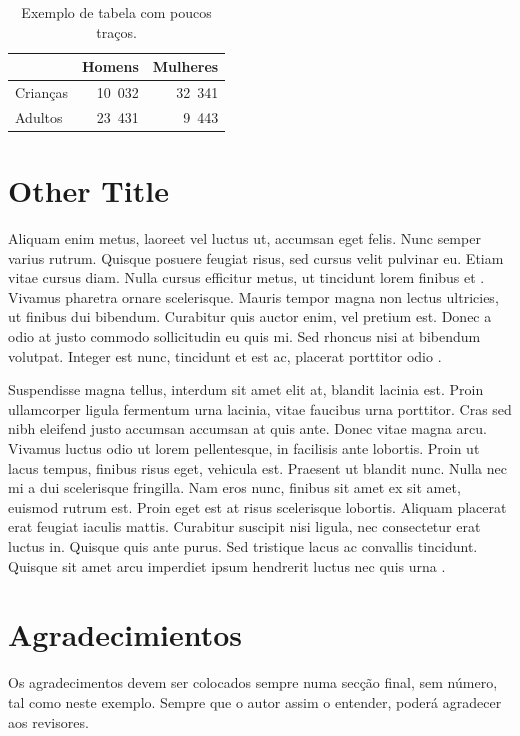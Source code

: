 \documentclass[a4paper, twocolumn, 11pt, twoside]{article}
\begin{document}
\begin{table}[htb]
  \centering
  \begin{tabular}{lrr}
    \toprule
    & \textbf{Homens} & \textbf{Mulheres} \\
    \midrule
    Crianças & 10~032 & 32~341 \\
    Adultos & 23~431 & 9~443 \\
    \bottomrule
  \end{tabular}
  \caption{Exemplo de tabela com poucos traços.}
  \label{tab:1}
\end{table}

\section{Other Title}

 Aliquam enim metus, laoreet vel luctus ut, accumsan eget felis. Nunc semper varius rutrum. Quisque posuere feugiat risus, sed cursus velit pulvinar eu. Etiam vitae cursus diam. Nulla cursus efficitur metus, ut tincidunt lorem finibus et \cite{Simoes-Guinovart-2019}. Vivamus pharetra ornare scelerisque. Mauris tempor magna non lectus ultricies, ut finibus dui bibendum. Curabitur quis auctor enim, vel pretium est. Donec a odio at justo commodo sollicitudin eu quis mi. Sed rhoncus nisi at bibendum volutpat. Integer est nunc, tincidunt et est ac, placerat porttitor odio \citep{Zhou-et-al-2024}. 

  Suspendisse magna tellus, interdum sit amet elit at, blandit lacinia est. Proin ullamcorper ligula fermentum urna lacinia, vitae faucibus urna porttitor. Cras sed nibh eleifend justo accumsan accumsan at quis ante. Donec vitae magna arcu. Vivamus luctus odio ut lorem pellentesque, in facilisis ante lobortis. Proin ut lacus tempus, finibus risus eget, vehicula est. Praesent ut blandit nunc. Nulla nec mi a dui scelerisque fringilla. Nam eros nunc, \cite{Almeida-2003} finibus sit amet ex sit amet, euismod rutrum est. Proin eget est at risus scelerisque lobortis. Aliquam placerat erat feugiat iaculis mattis. Curabitur suscipit nisi ligula, nec consectetur erat luctus in. Quisque quis ante purus. Sed tristique lacus ac convallis tincidunt. Quisque sit amet arcu imperdiet ipsum hendrerit luctus nec quis urna \citep{Simoes-2004}. 



\section*{Agradecimientos}

Os agradecimentos devem ser colocados sempre numa secção final, sem número, tal como
neste exemplo. Sempre que o autor assim o entender, poderá agradecer aos revisores.



\end{document}
